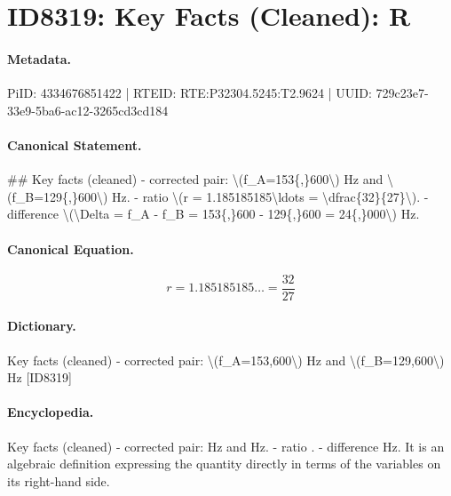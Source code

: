 \section*{ID8319: Key Facts (Cleaned): R}
\paragraph{Metadata.}
PiID: 4334676851422 | RTEID: RTE:P32304.5245:T2.9624 | UUID: 729c23e7-33e9-5ba6-ac12-3265cd3cd184

\paragraph{Canonical Statement.}
\#\# Key facts (cleaned) - corrected pair: \textbackslash{}(f\_A=153\{,\}600\textbackslash{}) Hz and \textbackslash{}(f\_B=129\{,\}600\textbackslash{}) Hz. - ratio \textbackslash{}(r = 1.185185185\textbackslash{}ldots = \textbackslash{}dfrac\{32\}\{27\}\textbackslash{}). - difference \textbackslash{}(\textbackslash{}Delta = f\_A - f\_B = 153\{,\}600 - 129\{,\}600 = 24\{,\}000\textbackslash{}) Hz.

\paragraph{Canonical Equation.}
\[
r = 1.185185185\ldots = \dfrac{32}{27}
\]

\paragraph{Dictionary.}
Key facts (cleaned) - corrected pair: \textbackslash{}(f\_A=153,600\textbackslash{}) Hz and \textbackslash{}(f\_B=129,600\textbackslash{}) Hz [ID8319]

\paragraph{Encyclopedia.}
Key facts (cleaned) - corrected pair: Hz and Hz. - ratio . - difference Hz. It is an algebraic definition expressing the quantity directly in terms of the variables on its right-hand side.

